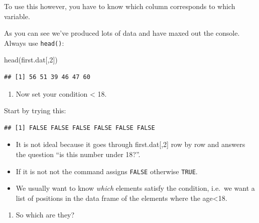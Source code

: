 \documentclass[
]{gitbook}
\newenvironment{Shaded}{\begin{snugshade}}{\end{snugshade}}
\newcommand{\DecValTok}[1]{\textcolor[rgb]{0.00,0.00,0.81}{#1}}
\newcommand{\FunctionTok}[1]{\textcolor[rgb]{0.00,0.00,0.00}{#1}}
\newcommand{\NormalTok}[1]{#1}
\newcommand{\SpecialCharTok}[1]{\textcolor[rgb]{0.00,0.00,0.00}{#1}}
\providecommand{\tightlist}{%
  \setlength{\itemsep}{0pt}\setlength{\parskip}{0pt}}
\begin{document}
To use this however, you have to know which column corresponds to which variable.

As you can see we've produced lots of data and have maxed out the console. Always use \texttt{head()}:

\begin{Shaded}
\begin{Highlighting}[]
\FunctionTok{head}\NormalTok{(first.dat[,}\DecValTok{2}\NormalTok{])}
\end{Highlighting}
\end{Shaded}

\begin{verbatim}
## [1] 56 51 39 46 47 60
\end{verbatim}

\begin{enumerate}
\def\labelenumi{\arabic{enumi}.}
\setcounter{enumi}{2}
\tightlist
\item
  Now set your condition \textless{} 18.
\end{enumerate}

Start by trying this:

\begin{Shaded}
\end{Shaded}

\begin{verbatim}
## [1] FALSE FALSE FALSE FALSE FALSE FALSE
\end{verbatim}

\begin{itemize}
\tightlist
\item
  It is not ideal because it goes through first.dat{[},2{]} row by row and answers the question ``is this number under 18?''.
\item
  If it is not not the command assigns \texttt{FALSE} otherwise \texttt{TRUE}.
\item
  We usually want to know \emph{which} elements satisfy the condition, i.e.~we want a list of positions in the data frame of the elements where the age\textless18.
\end{itemize}

\begin{enumerate}
\def\labelenumi{\arabic{enumi}.}
\setcounter{enumi}{3}
\tightlist
\item
  So which are they?
\end{enumerate}
\end{document}
